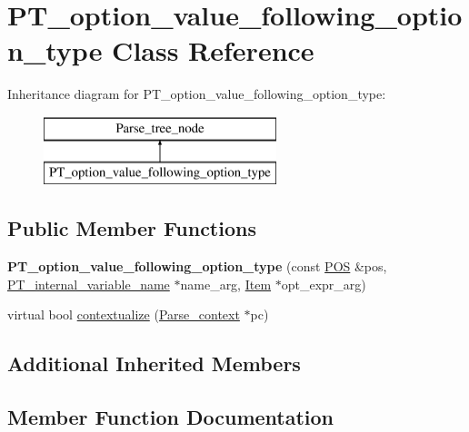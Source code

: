 \hypertarget{classPT__option__value__following__option__type}{}\section{P\+T\+\_\+option\+\_\+value\+\_\+following\+\_\+option\+\_\+type Class Reference}
\label{classPT__option__value__following__option__type}
Inheritance diagram for P\+T\+\_\+option\+\_\+value\+\_\+following\+\_\+option\+\_\+type\+:\begin{figure}[H]
\begin{center}
\leavevmode
\includegraphics[height=2.000000cm]{classPT__option__value__following__option__type}
\end{center}
\end{figure}
\subsection*{Public Member Functions}
\begin{DoxyCompactItemize}
\item 
\mbox{\label{classPT__option__value__following__option__type_ac1b7ae2ff3b18da0a0f9bca89bb18e49}} 
{\bfseries P\+T\+\_\+option\+\_\+value\+\_\+following\+\_\+option\+\_\+type} (const \mbox{\hyperlink{structYYLTYPE}{P\+OS}} \&pos, \mbox{\hyperlink{classPT__internal__variable__name}{P\+T\+\_\+internal\+\_\+variable\+\_\+name}} $\ast$name\+\_\+arg, \mbox{\hyperlink{classItem}{Item}} $\ast$opt\+\_\+expr\+\_\+arg)
\item 
virtual bool \mbox{\hyperlink{classPT__option__value__following__option__type_ac38fe2a0672f3a45cbf3276ca1854961}{contextualize}} (\mbox{\hyperlink{structParse__context}{Parse\+\_\+context}} $\ast$pc)
\end{DoxyCompactItemize}
\subsection*{Additional Inherited Members}


\subsection{Member Function Documentation}
\mbox{\label{classPT__option__value__following__option__type_ac38fe2a0672f3a45cbf3276ca1854961}} 

